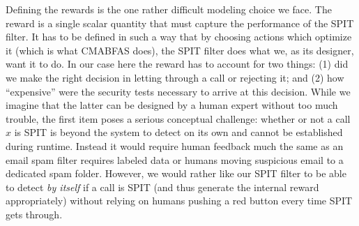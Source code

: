 \documentclass{llncs}
\begin{document}
Defining the rewards is the one rather difficult modeling choice we face. The reward
is a single scalar quantity that must capture the performance of the SPIT filter. It
has to be defined in such a way that by choosing actions which optimize it (which is what
CMABFAS does), the SPIT filter does what we, as its designer, want it to do.
In our case here the reward has to account for two things: (1) did we make the right decision
in letting through a call or rejecting it; and (2) how ``expensive'' were the security
tests necessary to arrive at this decision. While we imagine that the latter can be designed
by a human expert without too much trouble, the first item poses a serious conceptual
challenge: whether or not a call $x$ is SPIT is beyond the system to detect
on its own and cannot be established during runtime. Instead it would require human
feedback much the same as an email spam filter requires labeled data or humans moving 
suspicious email to a dedicated spam folder. However, we would rather like our SPIT filter to be
able to detect {\em by itself} if a call is SPIT (and thus generate the internal reward 
appropriately) without relying on humans pushing a red button every time SPIT gets through.  
\end{document}
